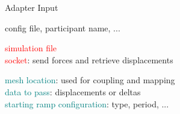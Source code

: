 \documentclass[10pt,t]{beamer}
\begin{document}
\begin{frame}{Adapter Input}
  \vspace{1.5cm}
  \begin{description}[Simulation]
  \itemsep 10pt
  \item[preCICE] \textcolor{dorange}{config file, participant name, ...}
  \item[MBDyn]      \textcolor{red}{simulation file} \\
                    \textcolor{red}{socket}: send forces and retrieve displacements \\
  \item[Simulation] \textcolor{teal}{mesh location}: used for coupling and mapping\\
                    \textcolor{teal}{data to pass}: displacements or deltas\\
                    \textcolor{teal}{starting ramp configuration}: type, period, ...
  \end{description}


\end{frame}
\end{document}
